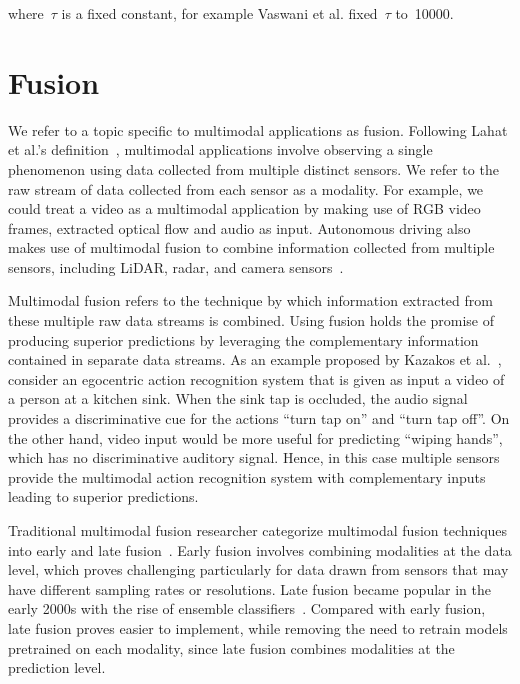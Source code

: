 where~$\tau$ is a fixed constant, for example Vaswani et al. fixed~$\tau$
to~\num{10000}.






\section{Fusion}

We refer to a topic specific to multimodal applications as fusion.
Following Lahat et al.'s definition~\cite{Lahat2015MultimodalDF}, multimodal
applications involve observing a single phenomenon using data collected from
multiple distinct sensors.
We refer to the raw stream of data collected from each sensor as a modality.
For example, we could treat a video as a multimodal application by making use
of RGB video frames, extracted optical flow and audio as input.
Autonomous driving also makes use of multimodal fusion to combine information
collected from multiple sensors, including LiDAR, radar, and camera
sensors~\cite{Feng2019DeepMO}.

Multimodal fusion refers to the technique by which information extracted from
these multiple raw data streams is combined.
Using fusion holds the promise of producing superior predictions by leveraging
the complementary information contained in separate data streams.
As an example proposed by Kazakos et al.~\cite{kazakos2019TBN}, consider an
egocentric action recognition system that is given as input a video of a person
at a kitchen sink.
When the sink tap is occluded, the audio signal provides a discriminative cue
for the actions ``turn tap on'' and ``turn tap off''.
On the other hand, video input would be more useful for predicting ``wiping
hands'', which has no discriminative auditory signal.
Hence, in this case multiple sensors provide the multimodal action recognition
system with complementary inputs leading to superior predictions.

Traditional multimodal fusion researcher categorize multimodal fusion
techniques into early and late fusion~\cite{ramachandram2017deepmultimodal}.
Early fusion involves combining modalities at the data level, which proves
challenging particularly for data drawn from sensors that may have different
sampling rates or resolutions.
Late fusion became popular in the early 2000s with the rise of ensemble
classifiers~\cite{kuncheva2004combining}.
Compared with early fusion, late fusion proves easier to implement, while
removing the need to retrain models pretrained on each modality, since late
fusion combines modalities at the prediction level.

